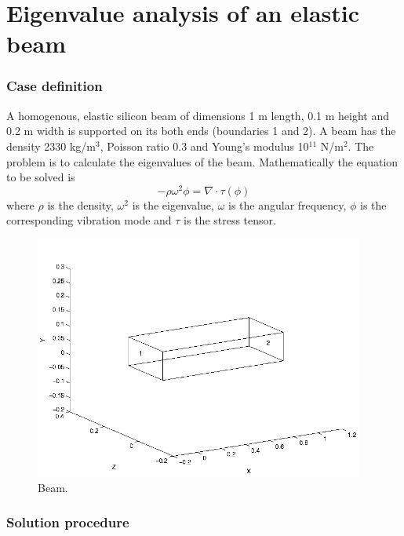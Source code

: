 \chapter{Eigenvalue analysis of an elastic beam}


\subsection*{Case definition}

A homogenous, elastic silicon beam of dimensions 1 m length, 0.1 m height and 0.2 m width
is supported on its both ends (boundaries 1 and 2). 
A beam has the density 2330 kg/m$^{3}$, Poisson ratio 0.3 and Young's modulus 10$^{11}$ N/m$^{2}$. The problem is to calculate the eigenvalues of the beam. Mathematically the equation to be solved is
\begin{displaymath}
-\rho \omega^{2}\phi = \nabla\cdot\tau(\phi)
\end{displaymath}
where $\rho$ is the density, $\omega$$^{2}$ is the eigenvalue, $\omega$ is the angular frequency, $\phi$ is the corresponding vibration mode and $\tau$ is the stress tensor.

\begin{figure}[h]
\centering
\includegraphics[height=80mm]{palkki}
\caption{Beam.}\label{fg:palkki}
\end{figure}




\subsection*{Solution procedure}

